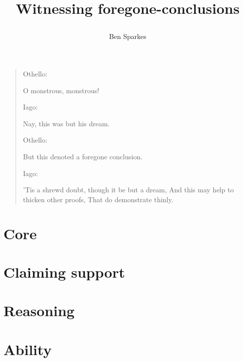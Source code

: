 \documentclass[10pt]{report}
\title{
  Witnessing foregone-conclusions










}
\author{Ben Sparkes}
\begin{document}

\maketitle

\begin{quote}
  Othello:

  O monstrous, monstrous!

  Iago:

  Nay, this was but his dream.

  Othello:

  But this denoted a foregone conclusion.

  Iago:

  'Tis a shrewd doubt, though it be but a dream,
  And this may help to thicken other proofs,
  That do demonstrate thinly.
\end{quote}

\tableofcontents

\newpage



% 

\part{Core}



\part{Claiming support}
\label{part:claimingSupportI}



\part{Reasoning}
\label{part:reasoning}

% 

% 



\part{Ability}
\label{part:ability}
\end{document}
